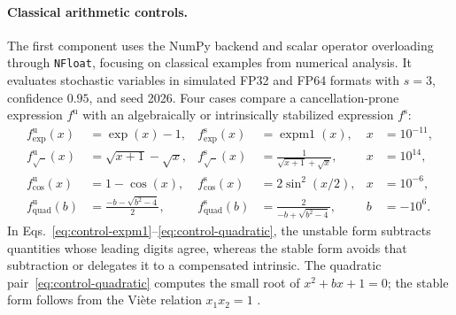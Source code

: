 \documentclass[manuscript, screen]{acmart}
\begin{document}
\paragraph{Classical arithmetic controls.}
The first component uses the NumPy backend and scalar operator overloading through \texttt{NFloat}, focusing on classical examples from numerical analysis. It evaluates stochastic variables in simulated FP32 and FP64 formats with $s=3$, confidence $0.95$, and seed 2026. Four cases compare a cancellation-prone expression $f^{\mathrm{u}}$ with an algebraically or intrinsically stabilized expression $f^{\mathrm{s}}$:
\begin{align}
f_{\exp}^{\mathrm{u}}(x)
&= \exp(x)-1,
&
f_{\exp}^{\mathrm{s}}(x)
&= \operatorname{expm1}(x),
& x&=10^{-11},
\label{eq:control-expm1}
\\
f_{\sqrt{\phantom{x}}}^{\mathrm{u}}(x)
&= \sqrt{x+1}-\sqrt{x},
&
f_{\sqrt{\phantom{x}}}^{\mathrm{s}}(x)
&= \frac{1}{\sqrt{x+1}+\sqrt{x}},
& x&=10^{14},
\label{eq:control-sqrt}
\\
f_{\cos}^{\mathrm{u}}(x)
&= 1-\cos(x),
&
f_{\cos}^{\mathrm{s}}(x)
&= 2\sin^2(x/2),
& x&=10^{-6},
\label{eq:control-cos}
\\
f_{\mathrm{quad}}^{\mathrm{u}}(b)
&= \frac{-b-\sqrt{b^2-4}}{2},
&
f_{\mathrm{quad}}^{\mathrm{s}}(b)
&= \frac{2}{-b+\sqrt{b^2-4}},
& b&=-10^6.
\label{eq:control-quadratic}
\end{align}
In Eqs.~\eqref{eq:control-expm1}--\eqref{eq:control-quadratic}, the unstable form subtracts quantities whose leading digits agree, whereas the stable form avoids that subtraction or delegates it to a compensated intrinsic. The quadratic pair~\eqref{eq:control-quadratic} computes the small root of $x^2+bx+1=0$; the stable form follows from the Vi\`ete relation $x_1x_2=1$ \citep{Goldberg1991FloatingPoint}.
\end{document}
